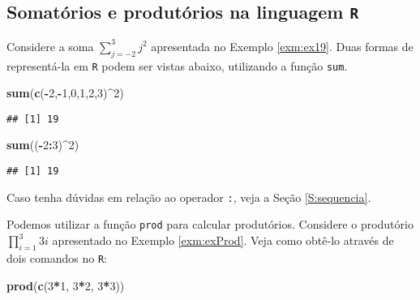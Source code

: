 \documentclass[]{book}
\newenvironment{Shaded}{\begin{snugshade}}{\end{snugshade}}
\newcommand{\DecValTok}[1]{\textcolor[rgb]{0.00,0.00,0.81}{#1}}
\newcommand{\KeywordTok}[1]{\textcolor[rgb]{0.13,0.29,0.53}{\textbf{#1}}}
\newcommand{\NormalTok}[1]{#1}
\newcommand{\OperatorTok}[1]{\textcolor[rgb]{0.81,0.36,0.00}{\textbf{#1}}}
\theoremstyle{definition}
\theoremstyle{definition}
\theoremstyle{definition}
\theoremstyle{remark}
\begin{document}
\hypertarget{somatuxf3rios-e-produtuxf3rios-na-linguagem-r}{%
\subsection{\texorpdfstring{Somatórios e produtórios na linguagem \texttt{R}}{Somatórios e produtórios na linguagem R}}\label{somatuxf3rios-e-produtuxf3rios-na-linguagem-r}}

Considere a soma \(\sum_{j=-2}^{3}j^2\) apresentada no Exemplo \ref{exm:ex19}.
Duas formas de representá-la em \texttt{R} podem ser vistas abaixo, utilizando a função \texttt{sum}.

\begin{Shaded}
\begin{Highlighting}[]
\KeywordTok{sum}\NormalTok{(}\KeywordTok{c}\NormalTok{(}\OperatorTok{-}\DecValTok{2}\NormalTok{,}\OperatorTok{-}\DecValTok{1}\NormalTok{,}\DecValTok{0}\NormalTok{,}\DecValTok{1}\NormalTok{,}\DecValTok{2}\NormalTok{,}\DecValTok{3}\NormalTok{)}\OperatorTok{^}\DecValTok{2}\NormalTok{)}
\end{Highlighting}
\end{Shaded}

\begin{verbatim}
## [1] 19
\end{verbatim}

\begin{Shaded}
\begin{Highlighting}[]
\KeywordTok{sum}\NormalTok{((}\OperatorTok{-}\DecValTok{2}\OperatorTok{:}\DecValTok{3}\NormalTok{)}\OperatorTok{^}\DecValTok{2}\NormalTok{)}
\end{Highlighting}
\end{Shaded}

\begin{verbatim}
## [1] 19
\end{verbatim}

Caso tenha dúvidas em relação ao operador \texttt{:}, veja a Seção \ref{S:sequencia}.

Podemos utilizar a função \texttt{prod} para calcular produtórios.
Considere o produtório \(\prod_{i=1}^{3} 3i\) apresentado no Exemplo \ref{exm:exProd}.
Veja como obtê-lo através de dois comandos no \texttt{R}:

\begin{Shaded}
\begin{Highlighting}[]
\KeywordTok{prod}\NormalTok{(}\KeywordTok{c}\NormalTok{(}\DecValTok{3}\OperatorTok{*}\DecValTok{1}\NormalTok{, }\DecValTok{3}\OperatorTok{*}\DecValTok{2}\NormalTok{, }\DecValTok{3}\OperatorTok{*}\DecValTok{3}\NormalTok{))}
\end{Highlighting}
\end{Shaded}
\end{document}
